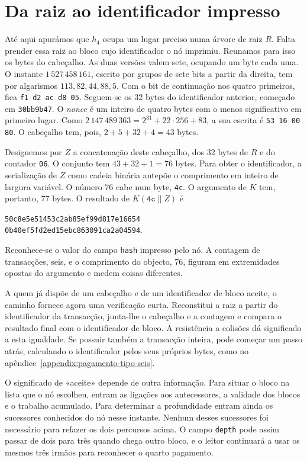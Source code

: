 \section{Da raiz ao identificador impresso}

Até aqui apurámos que \(h_4\) ocupa um lugar preciso numa árvore de
raiz \(R\). Falta prender essa raiz ao bloco cujo identificador o nó
imprimiu. Reunamos para isso os bytes do cabeçalho. As duas versões
valem sete, ocupando um byte cada uma. O instante \(1\,527\,458\,161\),
escrito por grupos de sete bits a partir da direita, tem por algarismos
\(113,82,44,88,5\). Com o bit de continuação nos quatro primeiros,
fica \texttt{f1 d2 ac d8 05}. Seguem-se os 32 bytes do identificador
anterior, começado em \texttt{30bb9b47}. O \emph{nonce} é um inteiro
de quatro bytes com o menos significativo em primeiro lugar.
Como \(2\,147\,489\,363=2^{31}+22\cdot256+83\), a sua escrita é
\texttt{53 16 00 80}. O cabeçalho tem, pois, \(2+5+32+4=43\) bytes.

Designemos por \(Z\) a concatenação deste cabeçalho, dos 32 bytes
de \(R\) e do contador \texttt{06}. O conjunto tem \(43+32+1=76\)
bytes. Para obter o identificador, a serialização de \(Z\) como
cadeia binária antepõe o comprimento em inteiro de largura variável.
O número 76 cabe num byte, \texttt{4c}. O argumento de \(K\) tem,
portanto, 77 bytes. O resultado de \(K(\mathtt{4c}\|Z)\) é
\begin{center}
\texttt{50c8e5e51453c2ab85ef99d817e16654}\\
\texttt{0b40ef5fd2ed15ebc863091ca2a04594}.
\end{center}
Reconhece-se o valor do campo \texttt{hash} impresso pelo nó. A
contagem de transacções, seis, e o comprimento do objecto, 76,
figuram em extremidades opostas do argumento e medem coisas diferentes.

A quem já dispõe de um cabeçalho e de um identificador de bloco
aceite, o caminho fornece agora uma verificação curta. Reconstitui
a raiz a partir do identificador da transacção, junta-lhe o cabeçalho
e a contagem e compara o resultado final com o identificador de bloco.
A resistência a colisões dá significado a esta igualdade. Se possuir
também a transacção inteira, pode começar um passo atrás, calculando
o identificador pelos seus próprios bytes, como no
apêndice~\ref{appendix:pagamento-tipo-seis}.

O significado de «aceite» depende de outra informação. Para situar
o bloco na lista que o nó escolheu, entram as ligações aos antecessores,
a validade dos blocos e o trabalho acumulado. Para determinar a
profundidade entram ainda os sucessores conhecidos do nó nesse
instante. Nenhum desses sucessores foi necessário para refazer os
dois percursos acima. O campo \texttt{depth} pode assim passar de
dois para três quando chega outro bloco, e o leitor continuará a
usar os mesmos três irmãos para reconhecer o quarto pagamento.
